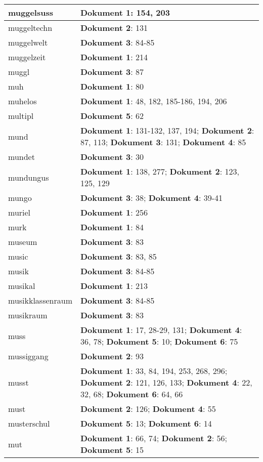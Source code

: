 \documentclass[a5paper]{article}
\begin{document}
\begin{longtable}[l]{|l|p{3in}|}
\hline
muggelsuss & \textbf{Dokument 1}: 154, 203 \\
\hline
muggeltechn & \textbf{Dokument 2}: 131 \\
\hline
muggelwelt & \textbf{Dokument 3}: 84-85 \\
\hline
muggelzeit & \textbf{Dokument 1}: 214 \\
\hline
muggl & \textbf{Dokument 3}: 87 \\
\hline
muh & \textbf{Dokument 1}: 80 \\
\hline
muhelos & \textbf{Dokument 1}: 48, 182, 185-186, 194, 206 \\
\hline
multipl & \textbf{Dokument 5}: 62 \\
\hline
mund & \textbf{Dokument 1}: 131-132, 137, 194; \textbf{Dokument 2}: 87, 113; \textbf{Dokument 3}: 131; \textbf{Dokument 4}: 85 \\
\hline
mundet & \textbf{Dokument 3}: 30 \\
\hline
mundungus & \textbf{Dokument 1}: 138, 277; \textbf{Dokument 2}: 123, 125, 129 \\
\hline
mungo & \textbf{Dokument 3}: 38; \textbf{Dokument 4}: 39-41 \\
\hline
muriel & \textbf{Dokument 1}: 256 \\
\hline
murk & \textbf{Dokument 1}: 84 \\
\hline
museum & \textbf{Dokument 3}: 83 \\
\hline
music & \textbf{Dokument 3}: 83, 85 \\
\hline
musik & \textbf{Dokument 3}: 84-85 \\
\hline
musikal & \textbf{Dokument 1}: 213 \\
\hline
musikklassenraum & \textbf{Dokument 3}: 84-85 \\
\hline
musikraum & \textbf{Dokument 3}: 83 \\
\hline
muss & \textbf{Dokument 1}: 17, 28-29, 131; \textbf{Dokument 4}: 36, 78; \textbf{Dokument 5}: 10; \textbf{Dokument 6}: 75 \\
\hline
mussiggang & \textbf{Dokument 2}: 93 \\
\hline
musst & \textbf{Dokument 1}: 33, 84, 194, 253, 268, 296; \textbf{Dokument 2}: 121, 126, 133; \textbf{Dokument 4}: 22, 32, 68; \textbf{Dokument 6}: 64, 66 \\
\hline
must & \textbf{Dokument 2}: 126; \textbf{Dokument 4}: 55 \\
\hline
musterschul & \textbf{Dokument 5}: 13; \textbf{Dokument 6}: 14 \\
\hline
mut & \textbf{Dokument 1}: 66, 74; \textbf{Dokument 2}: 56; \textbf{Dokument 5}: 15 \\

\end{longtable}
\end{document}
